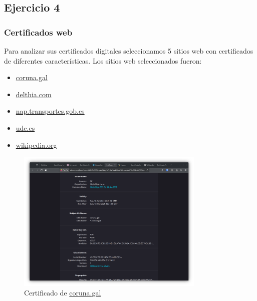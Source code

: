 \subsection{Ejercicio 4}
\graphicspath{ {img/04} }

\subsubsection{Certificados web}

Para analizar sus certificados digitales seleccionamos 5 sitios web con certificados de diferentes características. Los sitios web seleccionados fueron:
\begin{itemize}
    \item \href{https://www.coruna.gal}{coruna.gal}
    \item \href{https://delthia.com}{delthia.com}
    \item \href{https://nap.transportes.gob.es}{nap.transportes.gob.es}
    \item \href{https://www.udc.es}{udc.es}
    \item \href{www.wikipedia.org}{wikipedia.org}
\end{itemize}

\begin{figure}[H]   
    \centering
    \includegraphics[width=0.8\textwidth]{cert-coruna.png}
    \caption{Certificado de \url{coruna.gal}}
\end{figure}


